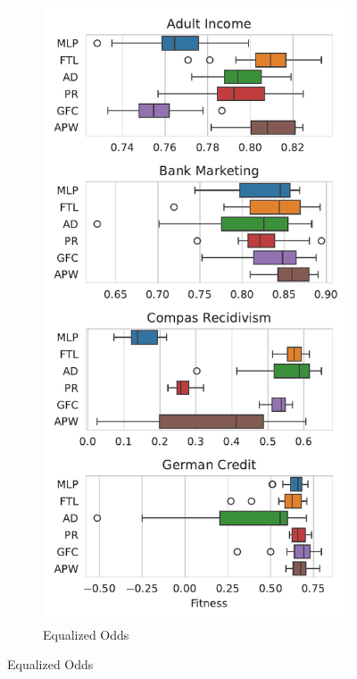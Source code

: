 \begin{figure}[!ht]
\begin{subfigure}{.32\linewidth}
\end{subfigure}
\begin{subfigure}{.32\linewidth}
    \caption{Equalized Odds}
    \label{fig:boxplot_acc_odds}
    \includegraphics[width=1\linewidth]{images/boxplot_acc_odds.pdf}
\end{subfigure}
\end{figure}

